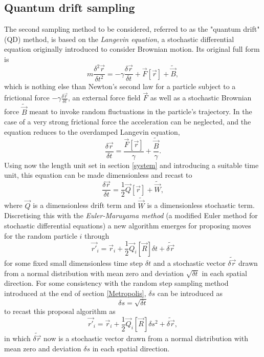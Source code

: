 \documentclass[a4paper,8pt]{article}
\begin{document}
\begin{multicols}{2}
\subsection{Quantum drift sampling}\label{QDsampling}
The second sampling method to be considered, referred to as the "quantum drift" (QD) method, is based on the \textit{Langevin equation}, a stochastic differential equation originally introduced to consider Brownian motion. Its original full form is
\begin{equation}
m\frac{\delta^2\vec{r}}{\delta t^2} = -\gamma\frac{\delta\vec{r}}{\delta t}+\vec{F}[\vec{r}]+\widetilde{\vec{B}},
\end{equation}
which is nothing else than Newton's second law for a particle subject to a frictional force $-\gamma\frac{\delta\vec{r}}{\delta t}$, an external force field $\vec{F}$ as well as a stochastic Brownian force $\widetilde{\vec{B}}$ meant to invoke random fluctuations in the particle's trajectory. In the case of a very strong frictional force the acceleration can be neglected, and the equation reduces to the overdamped Langevin equation,
\begin{equation}
\frac{\delta\vec{r}}{\delta t} = \frac{\vec{F}[\vec{r}]}{\gamma}+\frac{\widetilde{\vec{B}}}{\gamma}.
\end{equation}
Using now the length unit set in section \ref{system} and introducing a suitable time unit, this equation can be made dimensionless and recast to
\begin{equation}\label{Langevin}
\frac{\delta\vec{r}}{\delta t} = \frac{1}{2}\vec{Q}[\vec{r}]+\widetilde{\vec{W}}, 
\end{equation}
where $\vec{Q}$ is a dimensionless drift term and $\widetilde{\vec{W}}$ is a dimensionless stochastic term. Discretising this with the \textit{Euler-Maruyama method} (a modified Euler method for stochastic differential equations) a new algorithm emerges for proposing moves for the random particle $i$ through
\begin{equation}
\vec{r'}_i = \vec{r}_i+\frac{1}{2}\vec{Q}_i[\vec{R}]\delta t + \widetilde{\delta\vec{r}}
\end{equation}
for some fixed small dimensionless time step $\delta t$ and a stochastic vector $\widetilde{\delta\vec{r}}$ drawn from a normal distribution with mean zero and deviation $\sqrt{\delta t}$ in each spatial direction. For some consistency with the random step sampling method introduced at the end of section \ref{Metropolis}, $\delta s$ can be introduced as
\begin{equation}
\delta s = \sqrt{\delta t}
\end{equation}
to recast this proposal algorithm as
\begin{equation}\label{propLD}
\vec{r'}_i = \vec{r}_i+\frac{1}{2}\vec{Q}_i[\vec{R}]\delta s^2 + \widetilde{\delta\vec{r}}, 
\end{equation}
in which $\widetilde{\delta\vec{r}}$ now is a stochastic vector drawn from a normal distribution with mean zero and deviation $\delta s$ in each spatial direction.


\end{multicols}
\end{document}
